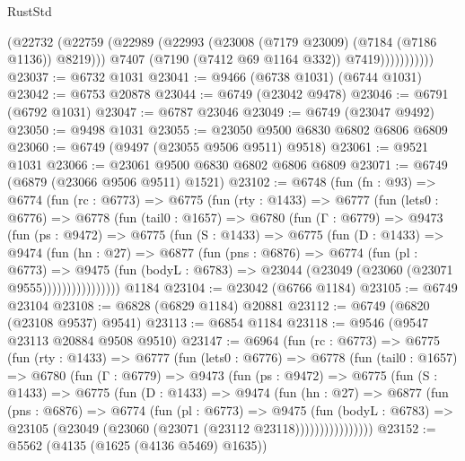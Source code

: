 \begin{lexlean}{RustStd}
\begin{coremodule}
                      (@22732
                        (@22759
                          (@22989 (@22993 (@23008 (@7179 @23009) (@7184 (@7186 @1136)) @8219)))
                          @7407
                          (@7190 (@7412 @69 @1164 @332))
                          @7419)))))))))))
@23037 := @6732 @1031
@23041 := @9466 (@6738 @1031) (@6744 @1031)
@23042 := @6753 @20878
@23044 := @6749 (@23042 @9478)
@23046 := @6791 (@6792 @1031)
@23047 := @6787 @23046
@23049 := @6749 (@23047 @9492)
@23050 := @9498 @1031
@23055 := @23050 @9500 @6830 @6802 @6806 @6809
@23060 := @6749 (@9497 (@23055 @9506 @9511) @9518)
@23061 := @9521 @1031
@23066 := @23061 @9500 @6830 @6802 @6806 @6809
@23071 := @6749 (@6879 (@23066 @9506 @9511) @1521)
@23102 := @6748
    (fun (fn : @93) =>
    @6774
      (fun (rc : @6773) =>
      @6775
        (fun (rty : @1433) =>
        @6777
          (fun (lets0 : @6776) =>
          @6778
            (fun (tail0 : @1657) =>
            @6780
              (fun (Γ : @6779) =>
              @9473
                (fun (ps : @9472) =>
                @6775
                  (fun (S : @1433) =>
                  @6775
                    (fun (D : @1433) =>
                    @9474
                      (fun (hn : @27) =>
                      @6877
                        (fun (pns : @6876) =>
                        @6774
                          (fun (pl : @6773) =>
                          @9475
                            (fun (bodyL : @6783) =>
                            @23044 (@23049 (@23060 (@23071 @9555))))))))))))))))
    @1184
@23104 := @23042 (@6766 @1184)
@23105 := @6749 @23104
@23108 := @6828 (@6829 @1184) @20881
@23112 := @6749 (@6820 (@23108 @9537) @9541)
@23113 := @6854 @1184
@23118 := @9546 (@9547 @23113 @20884 @9508 @9510)
@23147 := @6964
    (fun (rc : @6773) =>
    @6775
      (fun (rty : @1433) =>
      @6777
        (fun (lets0 : @6776) =>
        @6778
          (fun (tail0 : @1657) =>
          @6780
            (fun (Γ : @6779) =>
            @9473
              (fun (ps : @9472) =>
              @6775
                (fun (S : @1433) =>
                @6775
                  (fun (D : @1433) =>
                  @9474
                    (fun (hn : @27) =>
                    @6877
                      (fun (pns : @6876) =>
                      @6774
                        (fun (pl : @6773) =>
                        @9475
                          (fun (bodyL : @6783) =>
                          @23105 (@23049 (@23060 (@23071 (@23112 @23118))))))))))))))))
@23152 := @5562 (@4135 (@1625 (@4136 @5469) @1635))

\end{coremodule}
\end{lexlean}
